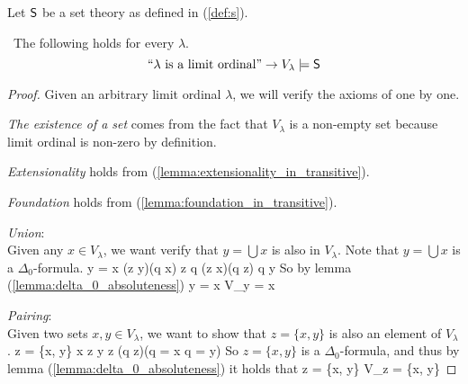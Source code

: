 Let $\sf{S}$ be a set theory as defined in (\ref{def:s}). 
\begin{lemma}\label{lemma:scm_s_is_limit}\
The following holds for every $\lambda$.
\begin{equation}
\mbox{``$\lambda$ is a limit ordinal''} \then V_\lambda \models \sf{S} %
\end{equation}
\end{lemma}

\begin{proof}
Given an arbitrary limit ordinal $\lambda$, we will verify the axioms of  one by one.
\bce[(i)]
\item \emph{The existence of a set} comes from the fact that $V_\lambda$ is a non-empty set because limit ordinal is non-zero by definition.

\item \emph{Extensionality} holds from (\ref{lemma:extensionality_in_transitive}).

\item \emph{Foundation} holds from (\ref{lemma:foundation_in_transitive}).

\item \emph{Union}:\\ %
Given any $x \in V_\lambda$, we want verify that $y = \bigcup x$ is also in $V_\lambda$. Note that $y = \bigcup x$ is a $\Delta_0$-formula.
\beq
y = \bigcup x \iff (\forall z \in y)(\exists q \in x) z \in q \et (\forall z \in x)(\forall q \in z) q \in y
\eeq
So by lemma (\ref{lemma:delta_0_absoluteness})
\beq
y = \bigcup x \iff V_\lambda \models y = \bigcup x
\eeq

\item \emph{Pairing}: \\ %
Given two sets $x, y \in V_\lambda$, we want to show that $z = \{x, y\}$ is also an element of $V_\lambda$.
\beq
z = \{x, y\} \iff x \in z \et y \in z \et (\forall q \in z)(q = x \lor q = y)
\eeq
So $z = \{x, y\}$ is a $\Delta_0$-formula, and thus by lemma (\ref{lemma:delta_0_absoluteness}) it holds that
\beq
z = \{x, y\} \iff V_\lambda \models z = \{x, y\}
\eeq



\end{proof}

